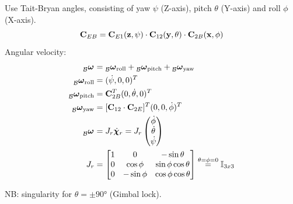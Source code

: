 \documentclass[a4paper, 8pt]{extarticle}
\newcommand{\mvec}[3]{  \prescript{}{\mathcal{#1}}{\bm{#2}}  _{#3} }
\begin{document}
\begin{multicols*}{3}
Use Tait-Bryan angles, consisting of yaw $\psi$ (Z-axis), pitch $\theta$ (Y-axis) and roll $\phi$ (X-axis). 
$${\bf C}_{EB} = {\bf C}_{E1}({\bf z}, \psi) \cdot {\bf C}_{12}({\bf y}, \theta) \cdot {\bf C}_{2B}({\bf x}, \phi)$$
Angular velocity:
\begin{align*}
\mvec{B}{\omega}{} &= \mvec{B}{\omega}{\text{roll}} + \mvec{B}{\omega}{\text{pitch}} + \mvec{B}{\omega}{\text{yaw}}\\
\mvec{B}{\omega}{\text{roll}} &= (\dot\psi, 0, 0)^T\\
\mvec{B}{\omega}{\text{pitch}} &= {\bf C}_{2B}^T(0,\dot\theta, 0)^T\\
\mvec{B}{\omega}{\text{yaw}} &= [{\bf C}_{12}\cdot {\bf C}_{2E}]^T (0, 0, \dot\phi)^T \\
\mvec{B}{\omega}{} &= J_r\dot{\bm \chi}_r = J_r \begin{pmatrix}
\dot\phi\\
\dot\theta\\
\dot\psi
\end{pmatrix} \\
J_r &= \begin{bmatrix}
1 & 0 & -\sin\theta \\
0 & \cos\phi  &  \sin\phi\cos\theta \\
0 & -\sin\phi  &  \cos\phi\cos\theta
\end{bmatrix}\overset{\theta=\phi=0}{=}\mathbb{I}_{3x3}
\end{align*} \newline

NB: singularity for $\theta = \pm \ang{90}$ (Gimbal lock).



\end{multicols*}
\end{document}
